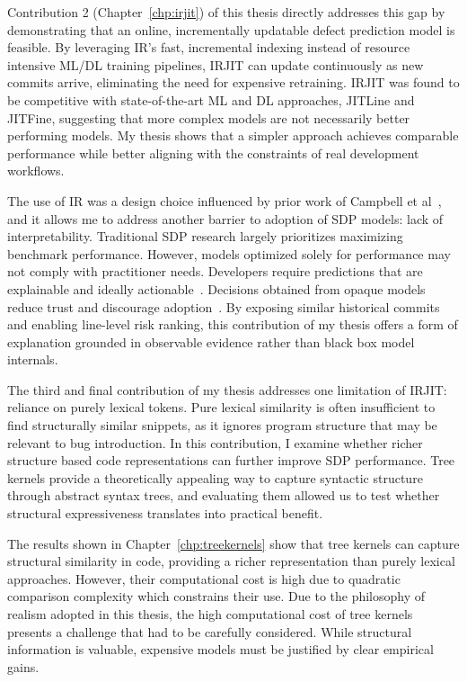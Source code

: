 \documentclass[\main/thesis.tex]{subfiles}
\begin{document}
Contribution 2 (Chapter~\ref{chp:irjit}) of this thesis directly addresses this gap by demonstrating that an online, incrementally updatable defect prediction model is feasible.
By leveraging IR's fast, incremental indexing instead of resource intensive ML/DL training pipelines, IRJIT can update continuously as new commits arrive, eliminating the need for expensive retraining.
IRJIT was found to be competitive with state-of-the-art ML and DL approaches, JITLine and JITFine, suggesting that more complex models are not necessarily better performing models. My thesis shows that a simpler approach achieves comparable performance while better aligning with the constraints of real development workflows.

The use of IR was a design choice influenced by prior work of Campbell et al~\cite{campbell2016unreasonable}, and it allows me to address another barrier to adoption of SDP models: lack of interpretability. Traditional SDP research largely prioritizes maximizing benchmark performance. However, models optimized solely for performance may not comply with practitioner needs. Developers require predictions that are explainable and ideally actionable~\cite{jiarpakdee2021practitioners}. Decisions obtained from opaque models reduce trust and discourage adoption~\cite{grattan2024need}. By exposing similar historical commits and enabling line-level risk ranking, this contribution of my thesis offers a form of explanation grounded in observable evidence rather than black box model internals.

The third and final contribution of my thesis addresses one limitation of IRJIT: reliance on purely lexical tokens. Pure lexical similarity is often insufficient to find structurally similar snippets, as it ignores program structure that may be relevant to bug introduction. In this contribution, I examine whether richer structure based code representations can further improve SDP performance. Tree kernels provide a theoretically appealing way to capture syntactic structure through abstract syntax trees, and evaluating them allowed us to test whether structural expressiveness translates into practical benefit. 

The results shown in Chapter~\ref{chp:treekernels} show that tree kernels can capture structural similarity in code, providing a richer representation than purely lexical approaches. However, their computational cost is high due to quadratic comparison complexity which constrains their use. 
Due to the philosophy of realism adopted in this thesis, the high computational cost of tree kernels presents a challenge that had to be carefully considered. While structural information is valuable, expensive models must be justified by clear empirical gains.
\end{document}
